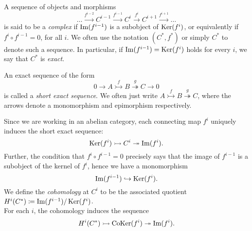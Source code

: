 \documentclass[a4paper]{article}
\def\into{\hookrightarrow}
\def\mono{\rightarrowtail}
\def\epi{\twoheadrightarrow}
\begin{document}
A sequence of objects and morphisms
\[
    \dots \stackrel{f^{i-2}}{\to} C^{i-1} \stackrel{f^{i-1}}{\to} C^{i} \stackrel{f^{i}}{\to} C^{i+1} \stackrel{f^{i+1}}{\to} \dots
\]
is said to be a \emph{complex} if $\operatorname{Im}(f^{i-1})$ is a subobject of $\operatorname{Ker}(f^i)$, or equivalently if $f^{i} \circ f^{i-1} = 0$, for all $i$. We often use the notation $(C^*, f^*)$ or simply $C^*$ to denote such a sequence. In particular, if $\operatorname{Im}(f^{i-1}) = \operatorname{Ker}(f^i)$ holds for every $i$, we say that $C^*$ is \emph{exact}.

An exact sequence of the form
\[
    0 \to A \stackrel{f}{\mono} B \stackrel{g}{\epi} C \to 0
\]
is called a \emph{short exact sequence}. We often just write $A \stackrel{f}{\mono} B \stackrel{g}{\epi} C$, where the arrows denote a monomorphism and epimorphism respectively.


Since we are working in an abelian category, each connecting map $f^i$ uniquely induces the short exact sequence:
\[
    \Ker(f^i) \mono C^{i} \epi \im(f^i).
\]
Further, the condition that $f^i \circ f^{i-1} = 0$ precisely says that the image of $f^{i-1}$ is a subobject of the kernel of $f^i$, hence we have a monomorphism
\[ %
    \im(f^{i-1}) \into \Ker(f^{i}).
\]
We define the \emph{cohomology} at $C^i$ to be the associated quotient $H^i(C^*) \coloneqq \operatorname{Im}(f^{i-1})/\operatorname{Ker}(f^i)$.\\

For each $i$, the cohomology induces the sequence
\[ %
    H^i(C^*) \mono \CoKer(f^i) \epi \im(f^i).
\]

\end{document}
